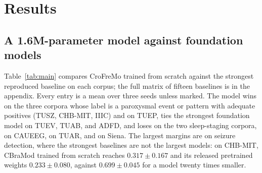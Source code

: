 \section{Results}
\label{sec:results}

\subsection{A 1.6M-parameter model against foundation models}
\label{sec:main}

Table~\ref{tab:main} compares CroFreMo trained from scratch against the
strongest reproduced baseline on each corpus; the full matrix of fifteen
baselines is in the appendix. Every entry is a mean over three seeds unless
marked. The model wins on the three corpora whose label is a paroxysmal
event or pattern with adequate positives (TUSZ, CHB-MIT, IIIC) and on TUEP,
ties the strongest foundation model on TUEV, TUAB, and ADFD, and loses on
the two sleep-staging corpora, on CAUEEG, on TUAR, and on Siena. The
largest margins are on seizure detection, where the strongest baselines are
not the largest models: on CHB-MIT, CBraMod trained from scratch reaches
$0.317 \pm 0.167$ and its released pretrained weights $0.233 \pm 0.080$,
against $0.699 \pm 0.045$ for a model twenty times smaller.

